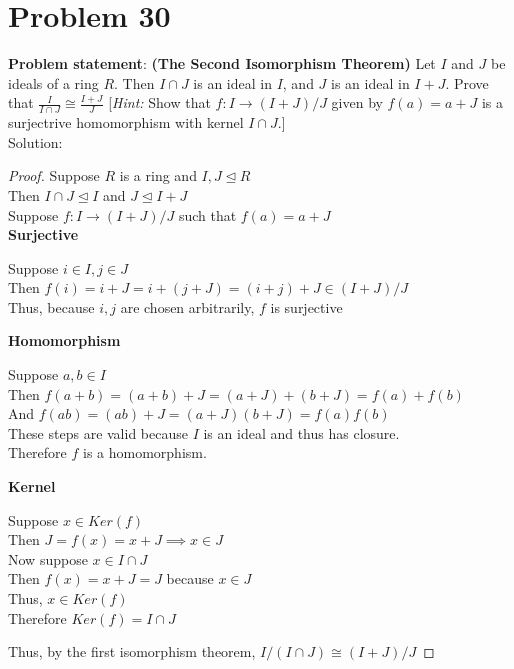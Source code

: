\documentclass{article} %
\begin{document}
\newpage

\section*{Problem 30}


\textbf{Problem statement}: \textbf{(The Second Isomorphism Theorem)} Let $I$ and $J$ be ideals of a ring $R$.  Then $I \cap J$ is an ideal in $I$, and $J$ is an ideal in $I + J$.  Prove that $\frac{I}{I \cap J} \cong \frac{I + J}{J}$ [\textit{Hint: } Show that $f: I \rightarrow (I + J)/J$ given by $f(a) = a + J$ is a surjectrive homomorphism with kernel $I \cap J$.]
\\

Solution: 
\begin{addmargin}[1em]{0em}
\begin{proof}
Suppose $R$ is a ring and $I,J \unlhd R$
\\Then $I \cap J \unlhd I$ and $J \unlhd I + J$
\\Suppose $f: I \rightarrow (I + J)/J$ such that $f(a) = a + J$
\\ \textbf{Surjective}
\begin{addmargin}[1em]{0em}
Suppose $i \in I, j \in J$
\\Then $f(i) = i + J = i + (j + J) = (i + j) + J \in (I + J)/J$
\\Thus, because $i, j$ are chosen arbitrarily, $f$ is surjective
\end{addmargin}
\textbf{Homomorphism}
\begin{addmargin}[1em]{0em}
Suppose $a,b \in I$
\\Then $f(a + b) = (a + b) + J = (a + J) + (b + J) = f(a) + f(b)$
\\And $f(ab) = (ab) + J = (a + J)(b + J) = f(a)f(b)$
\\These steps are valid because $I$ is an ideal and thus has closure.
\\Therefore $f$ is a homomorphism.
\end{addmargin}
\textbf{Kernel}
\begin{addmargin}[1em]{0em}
Suppose $x \in Ker (f)$
\\Then $J = f(x) = x + J \implies x \in J$
\\Now suppose $x \in I \cap J$
\\Then $f(x) = x + J = J$ because $x \in J$
\\Thus, $x \in Ker(f)$
\\Therefore $Ker(f) = I \cap J$
\end{addmargin}
Thus, by the first isomorphism theorem, $I/(I \cap J) \cong (I + J)/J$
\end{proof}
\end{addmargin}

\newpage
\end{document}
